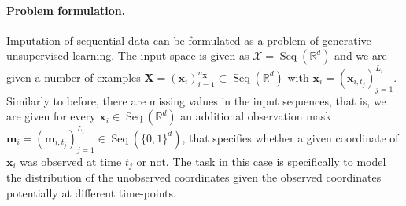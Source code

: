 \documentclass{article} \usepackage{iclr2021_conference,times}
\newcommand{\R}{\mathbb{R}}
\newcommand{\bx}{\mathbf{x}}
\newcommand{\bX}{\mathbf{X}}
\newcommand{\m}{\mathbf{m}}
\newcommand{\cX}{\mathcal{X}}
\newcommand{\Seq}[1]{\operatorname{Seq}(#1)}
\theoremstyle{plain}
\theoremstyle{definition}
\begin{document}
\paragraph{Problem formulation.} Imputation of sequential data can be formulated as a problem of generative unsupervised learning. The input space is given as $\cX = \Seq{\R^d}$ and we are given a number of examples $\bX = (\bx_i)_{i=1}^{n_\bX} \subset \Seq{\R^d}$ with $\bx_i = (\bx_{i, t_j})_{j=1}^{L_i}$. Similarly to before, there are missing values in the input sequences, that is, we are given for every $\bx_i \in \Seq{\R^d}$ an additional observation mask $\m_i = (\m_{i, t_j})_{j=1}^{L_i} \in \Seq{\{0, 1\}^d}$, that specifies whether a given coordinate of $\bx_i$ was observed at time $t_j$ or not. The task in this case is specifically to model the distribution of the unobserved coordinates given the observed coordinates potentially at different time-points.
\end{document}
